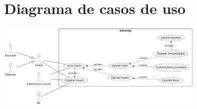 \documentclass[12pt]{article}
\begin{document}
    \section{Diagrama de casos de uso}
    \begin{center}
        \vfill
        \includegraphics[width=10cm]{Partes/casosDeUso.png}
        \vfill
    \end{center}
\end{document}
